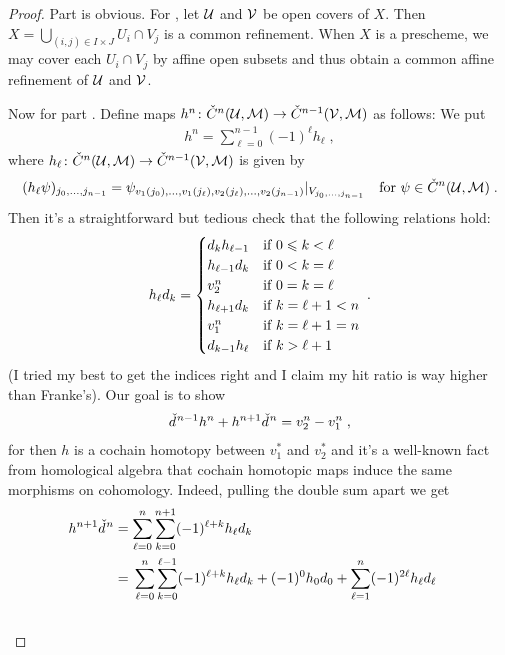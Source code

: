\documentclass[a4paper,parskip=half,numbers=enddot, DIV=12]{scrreprt}
\renewcommand{\leq}{\leqslant}
\begin{document}
\begin{proof}
	Part  is obvious. For , let $\mathcal{U}$ and $\mathcal{V}$ be open covers of $X$. Then $X=\bigcup_{(i,j)\in I\times J}U_i\cap V_j$ is a common refinement. When $X$ is a prescheme, we may cover each $U_i\cap V_j$ by affine open subsets and thus obtain a common affine refinement of $\mathcal{U}$ and $\mathcal{V}$.
	
	Now for part . Define maps $h^n\colon\check{C}^n(\Uu,\Mm)\morphism\check{C}^{n-1}(\Vv,\Mm)$ as follows: We put 
	\begin{align*}
		h^n=\sum_{\ell=0}^{n-1}(-1)^\ell h_\ell\;,
	\end{align*}
	where $h_\ell\colon\check{C}^n(\Uu,\Mm)\morphism\check{C}^{n-1}(\Vv,\Mm)$ is given by
	\begin{align*}
		(h_\ell\psi)_{j_0,\ldots,j_{n-1}}=\psi_{v_1(j_0),\ldots,v_1(j_\ell),v_2(j_\ell),\ldots,v_2(j_{n-1})}|_{V_{j_0,\ldots,j_{n-1}}}\quad\text{for }\psi\in\check{C}^n(\mathcal{U},\mathcal{M})\;.
	\end{align*}
	Then it's a straightforward but tedious check that the following relations hold:
	\begin{align}\lbl{eq:SHIT}
		h_\ell d_k=\begin{cases}
			d_kh_{\ell-1} & \text{if }0\leq k<\ell\\
			h_{\ell-1}d_{k} & \text{if }0< k=\ell\\
			v_2^n & \text{if }0=k=\ell\\
			h_{\ell+1}d_{k} & \text{if }k=\ell+1<n\\
			v_1^n & \text{if }k=\ell+1=n\\
			d_{k-1}h_\ell & \text{if }k>\ell+1
		\end{cases}\;.
	\end{align}
	(I tried my best to get the indices right and I claim my hit ratio is way higher than Franke's). Our goal is to show 
	\begin{align*}
		\check{d}\hspace{0.06125em}^{n-1}h^n+h^{n+1}\check{d}\hspace{0.06125em}^n=v_2^n-v_1^n\;,
	\end{align*}
	for then $h$ is a cochain homotopy between $v_1^*$ and $v_2^*$ and it's a well-known fact from homological algebra that cochain homotopic maps induce the same morphisms on cohomology. Indeed, pulling the double sum apart we get
	\begin{align*}
		h^{n+1}\hacek{d}^n&=\sum_{\ell=0}^{n}\sum_{k=0}^{n+1}(-1)^{\ell+k}h_\ell d_k\\
		&=\begin{multlined}[t]
			\sum_{\ell=0}^{n}\sum_{k=0}^{\ell-1}(-1)^{\ell+k}h_\ell d_k+(-1)^0h_0d_0+\sum_{\ell=1}^{n}(-1)^{2\ell}h_\ell d_\ell\\

\end{multlined}
\end{align*}
\end{proof}
\end{document}
